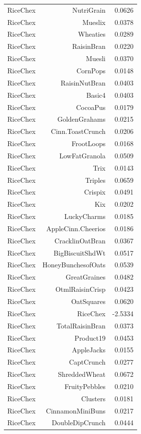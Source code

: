 \begin{longtable}{@{}lrr@{}}
RiceChex & NutriGrain & 0.0626 \\
RiceChex & Mueslix & 0.0378 \\
RiceChex & Wheaties & 0.0289 \\
RiceChex & RaisinBran & 0.0220 \\
RiceChex & Muesli & 0.0370 \\
RiceChex & CornPops & 0.0148 \\
RiceChex & RaisinNutBran & 0.0403 \\
RiceChex & Basic4 & 0.0403 \\
RiceChex & CocoaPus & 0.0179 \\
RiceChex & GoldenGrahams & 0.0215 \\
RiceChex & Cinn.ToastCrunch & 0.0206 \\
RiceChex & FrootLoops & 0.0168 \\
RiceChex & LowFatGranola & 0.0509 \\
RiceChex & Trix & 0.0143 \\
RiceChex & Triples & 0.0659 \\
RiceChex & Crispix & 0.0491 \\
RiceChex & Kix & 0.0202 \\
RiceChex & LuckyCharms & 0.0185 \\
RiceChex & AppleCinn.Cheerios & 0.0186 \\
RiceChex & CracklinOatBran & 0.0367 \\
RiceChex & BigBiscuitShdWt & 0.0517 \\
RiceChex & HoneyBunchesofOats & 0.0539 \\
RiceChex & GreatGraines & 0.0482 \\
RiceChex & OtmlRaisinCrisp & 0.0423 \\
RiceChex & OatSquares & 0.0620 \\
RiceChex & RiceChex & -2.5334 \\
RiceChex & TotalRaisinBran & 0.0373 \\
RiceChex & Product19 & 0.0453 \\
RiceChex & AppleJacks & 0.0155 \\
RiceChex & CaptCrunch & 0.0277 \\
RiceChex & ShreddedWheat & 0.0672 \\
RiceChex & FruityPebbles & 0.0210 \\
RiceChex & Clusters & 0.0181 \\
RiceChex & CinnamonMiniBuns & 0.0217 \\
RiceChex & DoubleDipCrunch & 0.0444 \\

\end{longtable}
